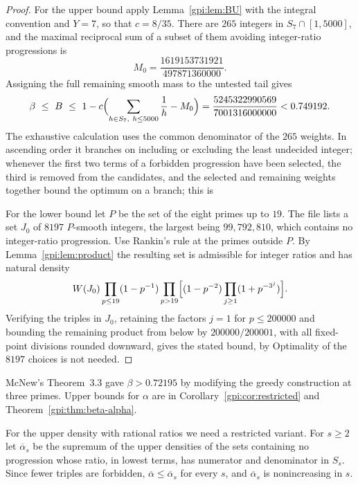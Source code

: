 \begin{proof}
For the upper bound apply Lemma~\ref{gpi:lem:BU} with the integral convention and $Y=7$, so
that $c=8/35$. There are $265$ integers in $S_7\cap[1,5000]$, and the maximal reciprocal sum
of a subset of them avoiding integer-ratio progressions is
\[
 M_0=\frac{1619153731921}{497871360000}.
\]
Assigning the full remaining smooth mass to the untested tail gives
\begin{equation}\label{gpi:eq:beta-upper}
 \beta\ \le\ B\ \le\ 1-c\Bigl(\sum_{h\in S_7,\ h\le5000}\frac1h-M_0\Bigr)
 =\frac{5245322990569}{7001316000000}<0.749192 .
\end{equation}
The exhaustive calculation uses the common denominator of the $265$ weights. In ascending
order it branches on including or excluding the least undecided integer; whenever the first
two terms of a forbidden progression have been selected, the third is removed from the
candidates, and the selected and remaining weights together bound the optimum on a branch; this is

For the lower bound let $P$ be the set of the
eight primes up to $19$. The file
lists a set
$J_0$ of $8197$ $P$-smooth integers, the largest being $99{,}792{,}810$, which contains no
integer-ratio progression. Use Rankin's rule at the primes outside $P$. By
Lemma~\ref{gpi:lem:product} the resulting set is admissible for integer ratios and has natural
density
\[
 W(J_0)\prod_{p\le19}(1-p^{-1})
 \prod_{p>19}\Bigl[(1-p^{-2})\prod_{j\ge1}(1+p^{-3^j})\Bigr].
\]
Verifying the triples in $J_0$, retaining the factors $j=1$ for $p\le200000$ and bounding the
remaining product from below by $200000/200001$, with all fixed-point divisions rounded
downward, gives the stated bound, by
Optimality of
the $8197$ choices is not needed.
\end{proof}

McNew's Theorem~3.3 gave $\beta>0.72195$ by modifying the greedy construction at three primes.
Upper bounds for $\alpha$ are in Corollary~\ref{gpi:cor:restricted} and Theorem~\ref{gpi:thm:beta-alpha}.

For the upper density with rational ratios we need a restricted variant. For $s\ge2$ let
$\overline\alpha_s$ be the supremum of the upper densities of the sets containing no
progression whose ratio, in lowest terms, has numerator and denominator in $S_s$. Since fewer
triples are forbidden, $\overline\alpha\le\overline\alpha_s$ for every $s$, and
$\overline\alpha_s$ is nonincreasing in $s$.

